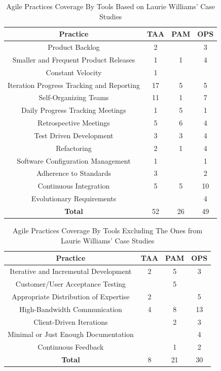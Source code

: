 \begin{table} [H]
\centering
	\scriptsize
	\begin{tabular}{| c | c | c | c |} \hline
		\textbf{Practice} & \textbf{TAA} & \textbf{PAM} & \textbf{OPS} \\ \hline
		Product Backlog & 2 & & 3 \\ \hline
		Smaller and Frequent Product Releases & 1 & 1 & 4 \\ \hline
		Constant Velocity & 1 & & \\ \hline
		Iteration Progress Tracking and Reporting & 17 & 5 & 5 \\ \hline
		Self-Organizing Teams & 11 & 1 & 7 \\ \hline
		Daily Progress Tracking Meetings & 1 & 5 & 1 \\ \hline
		Retrospective Meetings & 5 & 6 & 4 \\ \hline
		Test Driven Development & 3 & 3 & 4 \\ \hline
		Refactoring & 2 & 1 & 4 \\ \hline
		Software Configuration Management & 1 & & 1 \\ \hline
		Adherence to Standards & 3 & & 2 \\ \hline
		Continuous Integration & 5 & 5 & 10 \\ \hline	
		Evolutionary Requirements & & & 4 \\ \hline
		\textbf{Total} & 52 & 26 & 49 \\ \hline
	\end{tabular}
	\caption{{\footnotesize Agile Practices Coverage By Tools Based on Laurie Williams' Case Studies}}
\end{table}

\clearpage

\begin{table} [H]
\centering
	\footnotesize
	\begin{tabular}{| c | c | c | c |} \hline
		\textbf{Practice} & \textbf{TAA} & \textbf{PAM} & \textbf{OPS} \\ \hline
		Iterative and Incremental Development & 2 & 5 & 3 \\ \hline		
		Customer/User Acceptance Testing & & 5 & \\ \hline		
		Appropriate Distribution of Expertise & 2 & & 5 \\ \hline
		High-Bandwidth Communication & 4 & 8 & 13 \\ \hline					
		Client-Driven Iterations & & 2 & 3 \\ \hline
		Minimal or Just Enough Documentation & & & 4 \\ \hline
		Continuous Feedback & & 1 & 2 \\ \hline
		\textbf{Total} & 8 & 21 & 30 \\ \hline
	\end{tabular}
	\caption{{\footnotesize Agile Practices Coverage By Tools Excluding The Ones from Laurie Williams' Case Studies}}
\end{table}

